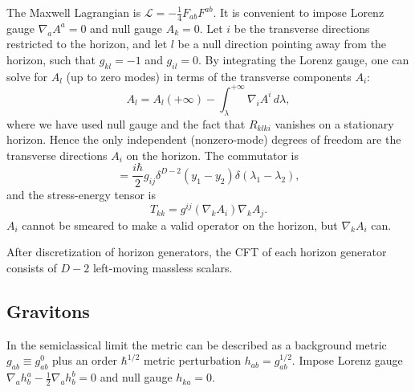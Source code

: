 \documentclass[12pt]{article}
\begin{document}
The Maxwell Lagrangian is $\mathcal{L} = -\frac{1}{4}F_{ab}F^{ab}$.  It is convenient to impose Lorenz gauge $\nabla_a A^a = 0$ and null gauge $A_k = 0$.  Let $i$ be the transverse directions restricted to the horizon, and let $l$ be a null direction pointing away from the horizon, such that $g_{kl} = -1$ and $g_{il} = 0$.  By integrating the Lorenz gauge, one can solve for $A_l$ (up to zero modes) in terms of the transverse components $A_i$:
\begin{equation}
A_l = A_l(+\infty) -\int^{+\infty}_\lambda \! \nabla_i A^i \,d\lambda,
\end{equation}
where we have used null gauge and the fact that $R_{klki}$ vanishes on a stationary horizon.  Hence the only independent (nonzero-mode) degrees of freedom are the transverse directions $A_i$ on the horizon.  The commutator is
\begin{equation}
[A_i(y_1,\,\lambda_1), \nabla_k A_j(y_2,\,\lambda_2)] =
\frac{i\hbar}{2} g_{ij} \delta^{D-2}(y_1 - y_2) \delta(\lambda_1 - \lambda_2),
\end{equation}
and the stress-energy tensor is
\begin{equation}
T_{kk} = g^{ij} (\nabla_k A_i) \nabla_k A_j.
\end{equation}
$A_i$ cannot be smeared to make a valid operator on the horizon, but $\nabla_k A_i$ can.

After discretization of horizon generators, the CFT of each horizon generator consists of $D - 2$ left-moving massless scalars.

\subsection{Gravitons}\label{grav}

In the semiclassical limit the metric can be described as a background metric
$g_{ab} \equiv g_{ab}^0$ plus an order $\hbar^{1/2}$ metric perturbation $h_{ab} = g_{ab}^{1/2}$.  Impose Lorenz gauge $\nabla_a h^a_b - \frac{1}{2} \nabla_a h^b_b = 0$ and null gauge $h_{ka} = 0$.
\end{document}
